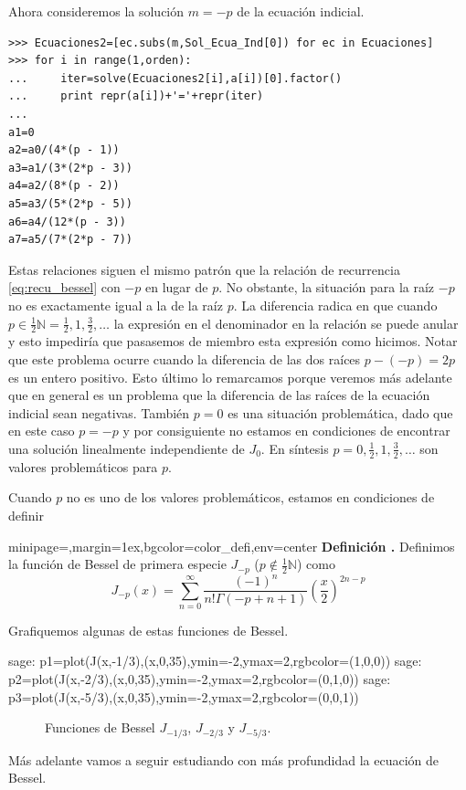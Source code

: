 \documentclass{article}
\newenvironment{colbox}[2]{%
    \begin{adjustbox}{minipage={\linewidth},margin=1ex,bgcolor=#1,env=center}
        #2}{%
    \end{adjustbox}%
}
\newcounter{defi_cont}
\newenvironment{definicion}[1]{\begin{colbox}{color_defi}{\refstepcounter{defi_cont}\textbf{Definición \arabic{defi_cont}.} #1}}{\end{colbox}}
\newcounter{lem_cont}
\begin{document}
Ahora consideremos la solución $m=-p$ de la ecuación indicial.
\begin{lstlisting}
>>> Ecuaciones2=[ec.subs(m,Sol_Ecua_Ind[0]) for ec in Ecuaciones]
>>> for i in range(1,orden):
...     iter=solve(Ecuaciones2[i],a[i])[0].factor()
...     print repr(a[i])+'='+repr(iter)
... 
a1=0
a2=a0/(4*(p - 1))
a3=a1/(3*(2*p - 3))
a4=a2/(8*(p - 2))
a5=a3/(5*(2*p - 5))
a6=a4/(12*(p - 3))
a7=a5/(7*(2*p - 7))

\end{lstlisting}
Estas relaciones siguen el mismo patrón que la relación de recurrencia \eqref{eq:recu_bessel} con $-p$ en lugar de $p$. No obstante, la situación para la raíz $-p$ no es exactamente igual a la de la raíz $p$. La diferencia radica en que cuando $p\in\frac12\mathbb{N}=\frac12,1,\frac32,\ldots$  la expresión en el denominador en la relación
se puede anular y esto  impediría que pasasemos de miembro esta expresión como hicimos. Notar que este problema ocurre cuando la diferencia de las dos raíces $p-(-p)=2p$ es un entero positivo.  Esto último lo remarcamos porque veremos más adelante que en general es un problema que la diferencia de las raíces de la ecuación indicial sean negativas. También $p=0$ es una situación problemática, dado que en este caso $p=-p$ y por consiguiente no estamos en condiciones de encontrar una solución linealmente independiente de $J_0$. En síntesis $p=0,\frac12,1,\frac32,\ldots$ son valores problemáticos para $p$. 

Cuando $p$ no es uno de los valores problemáticos, estamos en condiciones de definir
\begin{definicion}\label{def:bessel_segunda} Definimos la función de Bessel de primera especie $J_{-p}$ ($p\notin\frac12\mathbb{N}$) como
\[J_{-p}(x)=\sum_{n=0}^{\infty}\frac{(-1)^n}{n!\Gamma(-p+n+1)}\left(\frac{x}{2}\right)^{2n-p}\]
\end{definicion}
Grafiquemos algunas de estas funciones de Bessel.
\begin{sagecommandline}
sage: p1=plot(J(x,-1/3),(x,0,35),ymin=-2,ymax=2,rgbcolor=(1,0,0))
sage: p2=plot(J(x,-2/3),(x,0,35),ymin=-2,ymax=2,rgbcolor=(0,1,0))
sage: p3=plot(J(x,-5/3),(x,0,35),ymin=-2,ymax=2,rgbcolor=(0,0,1))
\end{sagecommandline}
\begin{figure}[h]
\caption{Funciones de Bessel $J_{-1/3}$, $J_{-2/3}$ y $J_{-5/3}$.} 
\end{figure}
Más adelante vamos a seguir estudiando con más profundidad la ecuación de Bessel.
\end{document}
